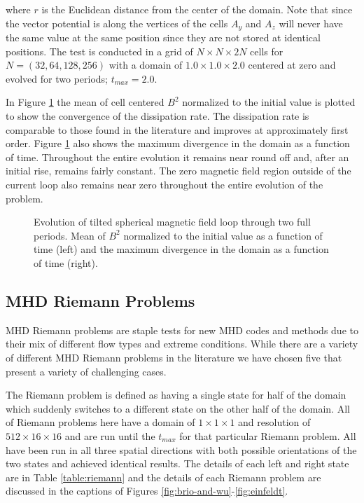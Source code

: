 where $r$ is the Euclidean distance from the center of the domain. Note that since the vector potential is along the vertices of the cells $A_y$ and $A_z$ will never have the same value at the same position since they are not stored at identical positions. The test is conducted in a grid of $N\times N\times 2N$ cells for $N=(32, 64, 128, 256)$ with a domain of $1.0\times1.0\times2.0$ centered at zero and evolved for two periods; $t_{max} = 2.0$.

In Figure \ref{fig:afl} the mean of cell centered $B^2$ normalized to the initial value is plotted to show the convergence of the dissipation rate. The dissipation rate is comparable to those found in the literature \citep{stone_athena_2008} and improves at approximately first order. Figure \ref{fig:afl} also shows the maximum divergence in the domain as a function of time. Throughout the entire evolution it remains near round off and, after an initial rise, remains fairly constant. The zero magnetic field region outside of the current loop also remains near zero throughout the entire evolution of the problem.
 
\begin{figure}[ht!]
    \caption{Evolution of tilted spherical magnetic field loop through two full periods. Mean of $B^2$ normalized to the initial value as a function of time (left) and the maximum divergence in the domain as a function of time (right). }
    \label{fig:afl}
\end{figure}

\subsection{MHD Riemann Problems}
\label{sec:riemann}

MHD Riemann problems are staple tests for new MHD codes and methods due to their mix of different flow types and extreme conditions. While there are a variety of different MHD Riemann problems in the literature \citep{brio_wu_1988, einfeldt_1991, ryu_jones_1995, dai_woodward_1998} we have chosen five that present a variety of challenging cases. 

The Riemann problem is defined as having a single state for half of the domain which suddenly switches to a different state on the other half of the domain. All of Riemann problems here have a domain of $1\times1\times1$ and resolution of $512\times16\times16$ and are run until the $t_{max}$ for that particular Riemann problem. All have been run in all three spatial directions with both possible orientations of the two states and achieved identical results. The details of each left and right state are in Table \ref{table:riemann} and the details of each Riemann problem are discussed in the captions of Figures \ref{fig:brio-and-wu}-\ref{fig:einfeldt}.

